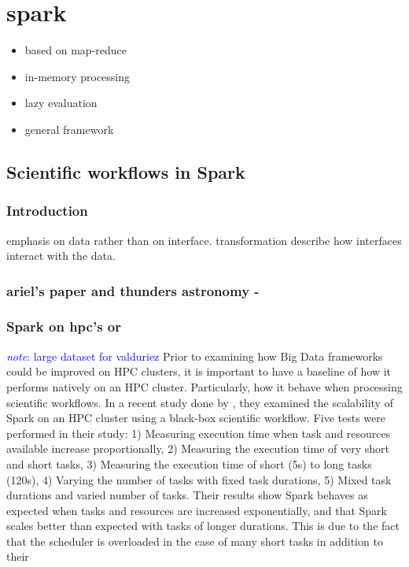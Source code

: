 \documentclass{report}
\newcommand{\note}[1]{\textcolor{blue}{\textit{note}: #1}}
\begin{document}
    \section{spark} \begin{itemize} \item based on
        map-reduce \item in-memory processing \item lazy evaluation \item
        general framework \end{itemize} 

    \subsection{Scientific workflows in Spark} \subsubsection{Introduction}
    emphasis on data rather than on interface. transformation describe how
    interfaces interact with the data.  \subsubsection{ariel's paper and
    thunders astronomy - } \subsubsection{Spark on hpc's or } \note{large
    dataset for valduriez} Prior to examining how Big Data frameworks could be
    improved on HPC clusters, it is important to have a baseline of how it
    performs natively on an HPC cluster.  Particularly, how it behave when
    processing scientific workflows. In a recent study done by \cite{valduriez},
    they examined the scalability of Spark on an HPC cluster using a black-box
    scientific workflow. Five tests were performed in their study: 1) Measuring
    execution time when task and resources available increase proportionally, 2)
    Measuring the execution time of very short and short tasks, 3) Measuring the
    execution time of short (5s) to long tasks (120s), 4) Varying the number of
    tasks with fixed task durations, 5) Mixed task durations and varied number
    of tasks. Their results show Spark behaves as expected when tasks and
    resources are increased exponentially, and that Spark scales better than
    expected with tasks of longer durations. This is due to the fact that the
    scheduler is overloaded in the case of many short tasks in addition to their
\end{document}
